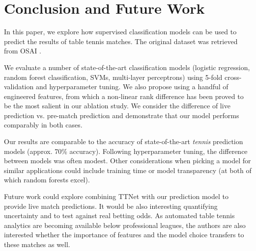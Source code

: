 \section{Conclusion and Future Work} \label{sec:conc}
In this paper, we explore how supervised classification models can be used to predict the results of table tennis matches.  The original dataset was retrieved from OSAI \cite{OSAI}.

We evaluate a number of state-of-the-art classification models (logistic regression, random forest classification, SVMs, multi-layer perceptrons) using 5-fold cross-validation and hyperparameter tuning. We also propose using a handful of engineered features, from which a non-linear rank difference has been proved to be the most salient in our ablation study. We consider the difference of live prediction vs. pre-match prediction and demonstrate that our model performs comparably in both cases.

Our results are comparable to the accuracy of state-of-the-art \textit{tennis} prediction models (approx. 70\% accuracy). Following hyperparameter tuning, the difference between models was often modest. Other considerations when picking a model for similar applications could include training time or model transparency (at both of which random forests excel). 

Future work could explore combining TTNet with our prediction model to provide live match predictions. It would be also interesting quantifying uncertainty and to test against real betting odds. As automated table tennis analytics are becoming available below professional leagues, the authors are also interested whether the importance of features and the model choice transfers to these matches as well.


